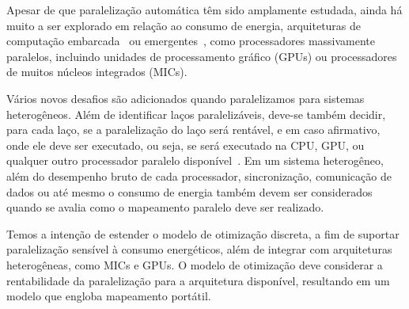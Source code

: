 \documentclass[a4paper,12pt]{article}
\begin{document}

Apesar de que paralelização automática têm sido amplamente estudada, ainda há muito a ser explorado em relação ao consumo de energia, arquiteturas de computação embarcada~\cite{cordes10} ou emergentes~\cite{leung09,baskaran10,amini12,govindarajan13}, como processadores massivamente paralelos, incluindo unidades de processamento gráfico (GPUs) ou processadores de muitos núcleos integrados (MICs).

Vários novos desafios são adicionados quando paralelizamos para sistemas heterogêneos. Além de identificar laços paralelizáveis, deve-se também decidir, para cada laço, se a paralelização do laço será rentável, e em caso afirmativo, onde ele deve ser executado, ou seja, se será executado na CPU, GPU, ou qualquer outro processador paralelo disponível~\cite{tournavitis09,wang14a,leung09}. Em um sistema heterogêneo, além do desempenho bruto de cada processador, sincronização, comunicação de dados ou até mesmo o consumo de energia também devem ser considerados quando se avalia como o mapeamento paralelo deve ser realizado.



Temos a intenção de estender o modelo de otimização discreta, a fim de suportar paralelização sensível à consumo energéticos, além de integrar com arquiteturas heterogêneas, como MICs e GPUs. O modelo de otimização deve considerar a rentabilidade da paralelização para a arquitetura disponível, resultando em um modelo que engloba mapeamento portátil.
\end{document}
